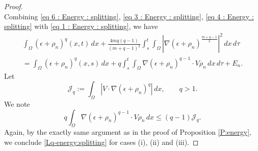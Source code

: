 \documentclass{amsart}
\numberwithin{equation}{section}
\begin{document}
\begin{proof}
\begin{equation}
\end{equation}
Combining \eqref{eq 6 : Energy : splitting}, \eqref{eq 3 : Energy : splitting}, \eqref{eq 4 : Energy : splitting} with \eqref{eq 1 : Energy : splitting}, we have
\begin{equation*}\label{eq 7 : Energy : splitting}
\begin{aligned}
 \int_\Omega (\epsilon+ \rho_n)^{q}(x,t) \,dx + \frac{4mq(q-1)}{(m+q-1)^2}\int_s^t \int_\Omega  \left | \nabla (\epsilon+\rho_n)^{\frac{m+q-1}{2}} \right |^2 \,dx\,d\tau  \\
 = \int_\Omega (\epsilon + \rho_n)^{q}(x,s) \,dx +  q \int_s^t \int_\Omega \nabla (\epsilon+\rho_n)^{q-1} \cdot V \rho_n \,dx \,d\tau + E_n.
\end{aligned}
\end{equation*}
Let 
\begin{equation*}
\mathcal{J}_q :=\int_\Omega \left | V\cdot \nabla(\epsilon +\rho_n)^q \right |\,dx, \qquad q >1.
\end{equation*}
We note
\begin{equation*}
 q \int_\Omega \nabla (\epsilon+\rho_n)^{q-1} \cdot V \rho_n \,dx \leq (q-1) \mathcal{J}_q. 
\end{equation*}
Again, by the exactly same argument as in the proof of Proposition \ref{P:energy}, we conclude \eqref{Lq-energy:splitting} for cases  (i), (ii) and (iii).

\end{proof}
\end{document}
